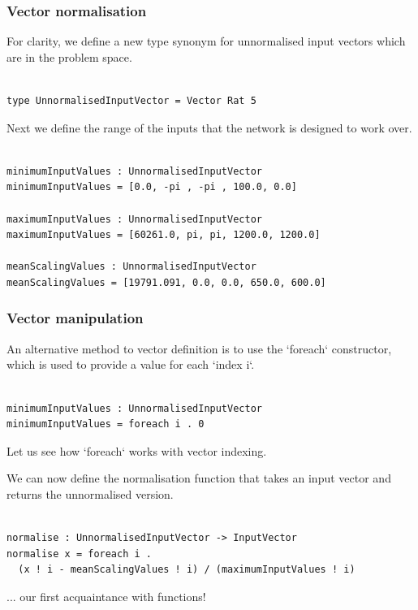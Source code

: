 \documentclass[t,compress,aspectratio=169]{beamer}
\begin{document}
\begin{frame}[fragile]
\frametitle{Vector normalisation}
\vspace{-2em}
For clarity, we define a new type synonym for unnormalised input vectors which are in the problem space.
\begin{verbatim}

type UnnormalisedInputVector = Vector Rat 5

\end{verbatim}

Next we define the range of the inputs that the network is designed
to work over.

\begin{verbatim}

minimumInputValues : UnnormalisedInputVector
minimumInputValues = [0.0, -pi , -pi , 100.0, 0.0]

maximumInputValues : UnnormalisedInputVector
maximumInputValues = [60261.0, pi, pi, 1200.0, 1200.0]

meanScalingValues : UnnormalisedInputVector
meanScalingValues = [19791.091, 0.0, 0.0, 650.0, 600.0]
\end{verbatim}
\end{frame}



\begin{frame}[fragile]
\frametitle{Vector manipulation}
\vspace{-2em}
An alternative method to vector definition is to use the `foreach` constructor, which is used to provide a value for each `index i`.
\begin{verbatim}

minimumInputValues : UnnormalisedInputVector
minimumInputValues = foreach i . 0

\end{verbatim}
Let us see how  `foreach` works with vector indexing.

We can now define the normalisation function that takes an input vector and
returns the unnormalised version.

\begin{verbatim}

normalise : UnnormalisedInputVector -> InputVector
normalise x = foreach i .
  (x ! i - meanScalingValues ! i) / (maximumInputValues ! i)
\end{verbatim}

\pause
... our first acquaintance with functions!

\end{frame}
\end{document}
